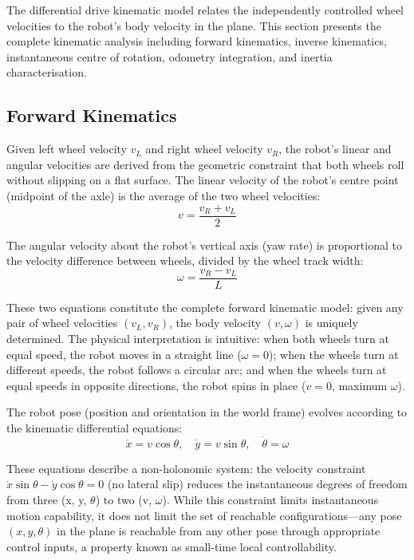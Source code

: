 \documentclass[12pt,a4paper,oneside]{report}
\begin{document}
The differential drive kinematic model relates the independently controlled wheel velocities to the robot's body velocity in the plane. This section presents the complete kinematic analysis including forward kinematics, inverse kinematics, instantaneous centre of rotation, odometry integration, and inertia characterisation.

\subsection{Forward Kinematics}

Given left wheel velocity $v_L$ and right wheel velocity $v_R$, the robot's linear and angular velocities are derived from the geometric constraint that both wheels roll without slipping on a flat surface. The linear velocity of the robot's centre point (midpoint of the axle) is the average of the two wheel velocities:
\begin{equation}
v = \frac{v_R + v_L}{2}
\label{eq:fk_linear}
\end{equation}

The angular velocity about the robot's vertical axis (yaw rate) is proportional to the velocity difference between wheels, divided by the wheel track width:
\begin{equation}
\omega = \frac{v_R - v_L}{L}
\label{eq:fk_angular}
\end{equation}

These two equations constitute the complete forward kinematic model: given any pair of wheel velocities $(v_L, v_R)$, the body velocity $(v, \omega)$ is uniquely determined. The physical interpretation is intuitive: when both wheels turn at equal speed, the robot moves in a straight line ($\omega = 0$); when the wheels turn at different speeds, the robot follows a circular arc; and when the wheels turn at equal speeds in opposite directions, the robot spins in place ($v = 0$, maximum $\omega$).

The robot pose (position and orientation in the world frame) evolves according to the kinematic differential equations:
\begin{equation}
\dot{x} = v\cos\theta, \quad \dot{y} = v\sin\theta, \quad \dot{\theta} = \omega
\label{eq:pose_ode}
\end{equation}

These equations describe a non-holonomic system: the velocity constraint $\dot{x}\sin\theta - \dot{y}\cos\theta = 0$ (no lateral slip) reduces the instantaneous degrees of freedom from three (x, y, $\theta$) to two (v, $\omega$). While this constraint limits instantaneous motion capability, it does not limit the set of reachable configurations---any pose $(x, y, \theta)$ in the plane is reachable from any other pose through appropriate control inputs, a property known as small-time local controllability.
\end{document}
